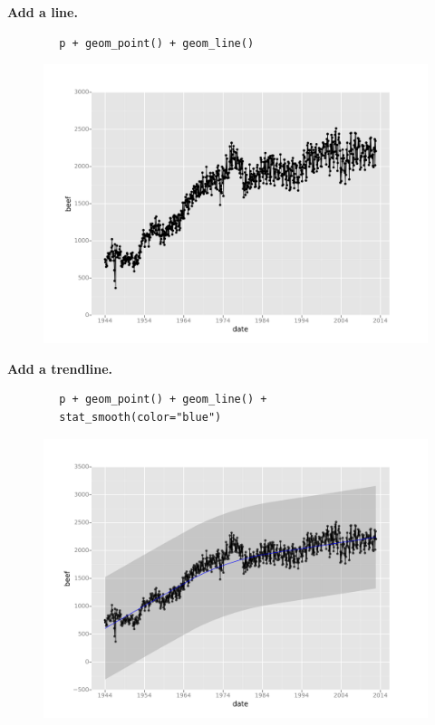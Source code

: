 \documentclass{beamer}
\begin{document}
\begin{frame}[fragile]
\textbf{	Add a line.}
	\begin{framed}
		\begin{verbatim}
		p + geom_point() + geom_line()
		\end{verbatim}
	\end{framed}
	\begin{figure}
		\centering
		\includegraphics[width=0.7\linewidth]{Layers3}
	\end{figure}
	
\end{frame}

\begin{frame}[fragile]
\textbf{	Add a trendline.}
	\begin{framed}
		\begin{verbatim}
		p + geom_point() + geom_line() +
		stat_smooth(color="blue")
		\end{verbatim}
	\end{framed}
	\begin{figure}
		\centering
		\includegraphics[width=0.7\linewidth]{layers4}
	\end{figure}
\end{frame}
\end{document}
